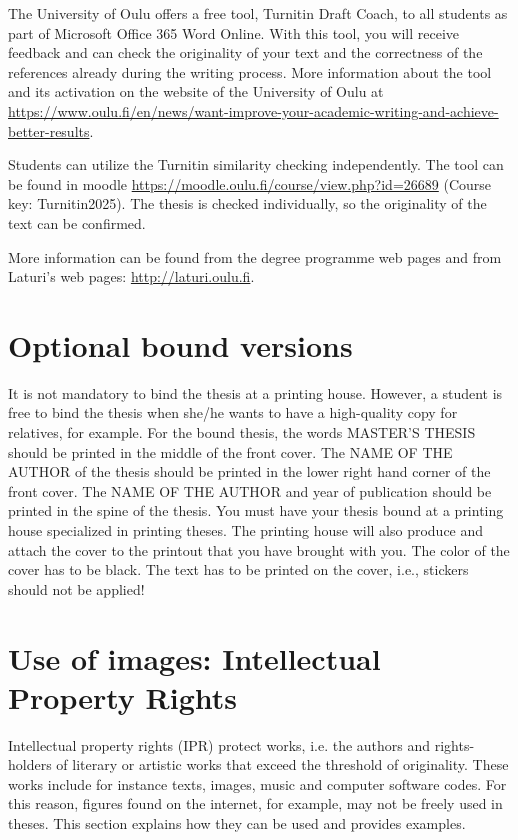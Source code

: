 The University of Oulu offers a free tool, Turnitin Draft Coach, to all students as part of
Microsoft Office 365 Word Online. With this tool, you will receive feedback and can check the
originality of your text and the correctness of the references already during the writing process.
More information about the tool and its activation on the website of the University of Oulu at
\url{https://www.oulu.fi/en/news/want-improve-your-academic-writing-and-achieve-better-results}.

Students can utilize the Turnitin similarity checking independently. The tool can be found
in moodle \url{https://moodle.oulu.fi/course/view.php?id=26689} (Course key: Turnitin2025). The
thesis is checked individually, so the originality of the text can be confirmed.

More information can be found from the degree programme web pages \cite{mscstudies} and from Laturi’s web pages: \url{http://laturi.oulu.fi}.

\section{Optional bound versions}

It is not mandatory to bind the thesis at a printing house. However, a student is free to bind the thesis when she/he wants to have a high-quality copy for relatives, for example. For the bound thesis, the words MASTER’S THESIS should be printed in the middle of the front cover. The NAME OF THE AUTHOR of the thesis should be printed in the lower right hand corner of the front cover. The NAME OF THE AUTHOR and year of publication should be printed in the spine of the thesis. You must have your thesis bound at a printing house specialized in printing theses. The printing house will also produce and attach the cover to the printout that you have brought with you. The color of the cover has to be black. The text has to be printed on the cover, i.e., stickers should not be applied!

\section{Use of images: Intellectual Property Rights}
\label{copyright}
Intellectual property rights (IPR) protect works, i.e. the authors and rights-holders of literary or artistic works that exceed the threshold of originality. These works include for instance texts, images, music and computer software codes. For this reason, figures found on the internet, for example, may not be freely used in theses. This section explains how they can be used and provides examples.

